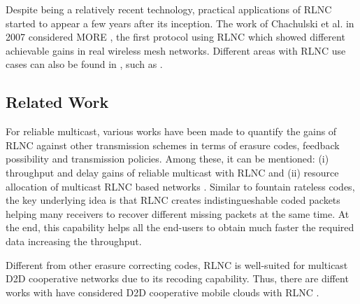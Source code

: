 Despite being a relatively recent technology, practical applications of \ac{RLNC} started to appear a few years after its inception. The work of Chachulski et al. in 2007 considered \ac{MORE} \cite{chachulski2007more}, the first protocol using \ac{RLNC} which showed different achievable gains in real wireless mesh networks. Different areas with \ac{RLNC} use cases can also be found in \cite{fragouli2006network}, such as   .

\subsection{Related Work}

For reliable multicast, various works have been made to quantify the gains of \ac{RLNC} against other transmission schemes in terms of erasure codes, feedback possibility and transmission policies. Among these, it can be mentioned: (i) throughput and delay gains of reliable multicast with \ac{RLNC} \cite{eryilmaz2008delay} and (ii) resource allocation of multicast \ac{RLNC} based networks \cite{chiti2013optimized,tassi2015resource}. Similar to fountain rateless codes, the key underlying idea is that \ac{RLNC} creates indistingueshable coded packets helping many receivers to recover different missing packets at the same time. At the end, this capability helps all the end-users to obtain much faster the required data increasing the throughput.

Different from other erasure correcting codes, \ac{RLNC} is well-suited for multicast \ac{D2D} cooperative networks due to its recoding capability. Thus, there are diffent works with have considered \ac{D2D} cooperative mobile clouds with \ac{RLNC} \cite{heide2012green,fitzek2013implementation,militano2014wi}.


\clearpage
